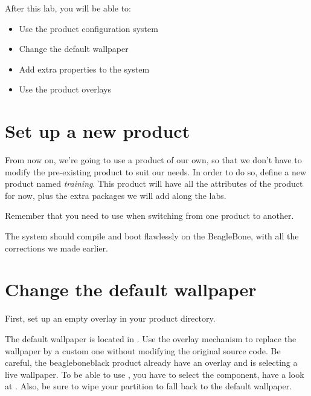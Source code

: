 
After this lab, you will be able to:
\begin{itemize}
  \item Use the product configuration system
  \item Change the default wallpaper
  \item Add extra properties to the system
  \item Use the product overlays
\end{itemize}

\section{Set up a new product}

From now on, we're going to use a product of our own, so that we don't
have to modify the pre-existing  product to suit
our needs. In order to do so, define a new product named
\textit{training}. This product will have all the attributes of the
 product for now, plus the extra packages we
will add along the labs.

Remember that you need to use  when switching
from one product to another.

The system should compile and boot flawlessly on the BeagleBone, with
all the corrections we made earlier.

\section{Change the default wallpaper}

First, set up an empty overlay in your product directory.

The default wallpaper is located in .
Use the overlay mechanism to replace the wallpaper by a custom one without
modifying the original source code. Be careful, the beagleboneblack
product already have an overlay and is selecting a live wallpaper. To
be able to use , you have to select the
 component, have a look at
.  Also, be sure
to wipe your  partition to fall back to the
default wallpaper.
